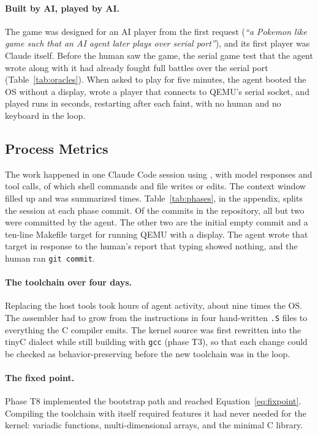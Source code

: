 \documentclass{article}
\begin{document}
\paragraph{Built by AI, played by AI.} The game was designed for an AI player from the first
request (\emph{``a Pokemon like game such that an AI agent later plays over serial port''}),
and its first player was Claude itself. Before the human saw the game, the serial game
test that the agent wrote along with it had already fought full battles over the serial
port (Table~\ref{tab:oracles}). When asked to play for five minutes, the agent booted the
OS without a display, wrote a player that connects to QEMU's serial socket, and played
\playruns{} runs in \playseconds{} seconds, restarting after each faint, with no human and no
keyboard in the loop. 


\subsection{Process Metrics}\label{sec:history}

The work happened in one Claude Code session using \sessionmodel{}, with
\nassistant{} model responses and \ntoolcalls{} tool calls, of which \nbash{} shell
commands and \nedit{} file writes or edits. The context window filled up and was
summarized \ncompactions{} times. Table~\ref{tab:phases}, in the appendix, splits the session at each phase commit. Of the \ncommits{} commits in the repository, all but two were committed by
the agent. The other two are the initial empty commit and a ten-line Makefile target for
running QEMU with a display. The agent wrote that target in response to the human's
report that typing showed nothing, and the human ran \texttt{git commit}.

\paragraph{The toolchain over four days.} Replacing the host tools took
\tcactivehours{} hours of agent activity, about nine times the OS. The assembler had to
grow from the instructions in four hand-written \texttt{.S} files to everything the C
compiler emits. The kernel source was first rewritten into the tinyC dialect while still
building with \texttt{gcc} (phase T3), so that each change could be checked as
behavior-preserving before the new toolchain was in the loop.

\paragraph{The fixed point.} Phase T8 implemented the bootstrap path and reached
Equation~\eqref{eq:fixpoint}. Compiling the toolchain with itself required features it
had never needed for the kernel: variadic functions, multi-dimensional arrays, and the
minimal C library.
\end{document}
